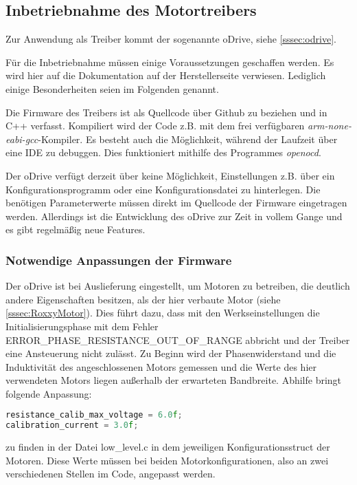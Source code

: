 \renewcommand{\autoren}{Stephan Morongowski}
\newpage
\subsection{Inbetriebnahme des Motortreibers}

Zur Anwendung als Treiber kommt der sogenannte oDrive, siehe \ref{sssec:odrive}.

Für die Inbetriebnahme müssen einige Voraussetzungen geschaffen werden. Es wird hier auf die Dokumentation auf der Herstellerseite verwiesen. Lediglich einige Besonderheiten seien im Folgenden genannt.

Die Firmware des Treibers ist als Quellcode über Github zu beziehen und in C++ verfasst. Kompiliert wird der Code z.B. mit dem frei verfügbaren \textit{arm-none-eabi-gcc}-Kompiler. Es besteht auch die Möglichkeit, während der Laufzeit über eine IDE zu debuggen. Dies funktioniert mithilfe des Programmes \textit{openocd}.

Der oDrive verfügt derzeit über keine Möglichkeit, Einstellungen z.B. über ein Konfigurationsprogramm oder eine Konfigurationsdatei zu hinterlegen. Die benötigen Parameterwerte müssen direkt im Quellcode der Firmware eingetragen werden. Allerdings ist die Entwicklung des oDrive zur Zeit in vollem Gange und es gibt regelmäßig neue Features.

\subsubsection{Notwendige Anpassungen der Firmware}
Der oDrive ist bei Auslieferung eingestellt, um Motoren zu betreiben, die deutlich andere Eigenschaften besitzen, als der hier verbaute Motor (siehe \ref{sssec:RoxxyMotor}). Dies führt dazu, dass mit den Werkseinstellungen die Initialisierungsphase mit dem Fehler ERROR\_PHASE\_RESISTANCE\_OUT\_OF\_RANGE abbricht und der Treiber eine Ansteuerung nicht zulässt.
Zu Beginn wird der Phasenwiderstand und die Induktivität des angeschlossenen Motors gemessen und die Werte des hier verwendeten Motors liegen außerhalb der erwarteten Bandbreite. Abhilfe bringt folgende Anpassung:

\begin{lstlisting}[language=C++]
resistance_calib_max_voltage = 6.0f;
calibration_current = 3.0f;
\end{lstlisting}
zu finden in der Datei low\_level.c in dem jeweiligen Konfigurationsstruct der Motoren. Diese Werte müssen bei beiden Motorkonfigurationen, also an zwei verschiedenen Stellen im Code, angepasst werden.

